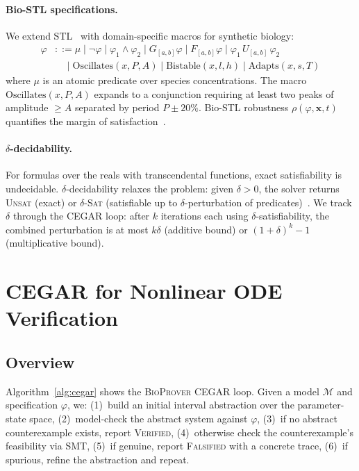 \documentclass[11pt]{article}
\newcommand{\bioprover}{\textsc{BioProver}}
\newcommand{\cegar}{\textsc{CEGAR}}
\newcommand{\stl}{\textsc{STL}}
\begin{document}
\paragraph{Bio-STL specifications.}
We extend \stl{}~\cite{maler2004monitoring} with domain-specific
macros for synthetic biology:
\begin{align*}
  \varphi &::= \mu \mid \neg\varphi \mid \varphi_1 \land \varphi_2
           \mid G_{[a,b]}\varphi \mid F_{[a,b]}\varphi
           \mid \varphi_1\,U_{[a,b]}\,\varphi_2 \\
  &\quad\mid \text{Oscillates}(x, P, A) \mid \text{Bistable}(x, l, h)
   \mid \text{Adapts}(x, s, T)
\end{align*}
where $\mu$ is an atomic predicate over species concentrations. The
macro $\text{Oscillates}(x,P,A)$ expands to a conjunction requiring
at least two peaks of amplitude $\geq A$ separated by period
$P \pm 20\%$. Bio-STL robustness $\rho(\varphi, \mathbf{x}, t)$
quantifies the margin of satisfaction~\cite{donze2013efficient}.

\paragraph{$\delta$-decidability.}
For formulas over the reals with transcendental functions,
exact satisfiability is undecidable. $\delta$-decidability
relaxes the problem: given $\delta > 0$, the solver returns
\textsc{Unsat} (exact) or $\delta$\textsc{-Sat} (satisfiable up to
$\delta$-perturbation of predicates)~\cite{gao2013dreal}. We track
$\delta$ through the \cegar{} loop: after $k$ iterations each using
$\delta$-satisfiability, the combined perturbation is at most
$k\delta$ (additive bound) or $(1+\delta)^k - 1$ (multiplicative
bound).

\section{CEGAR for Nonlinear ODE Verification}
\label{sec:cegar}

\subsection{Overview}

Algorithm~\ref{alg:cegar} shows the \bioprover{} \cegar{} loop.
Given a model $\mathcal{M}$ and specification $\varphi$, we:
(1)~build an initial interval abstraction over the parameter-state
space, (2)~model-check the abstract system against $\varphi$,
(3)~if no abstract counterexample exists, report \textsc{Verified},
(4)~otherwise check the counterexample's feasibility via SMT,
(5)~if genuine, report \textsc{Falsified} with a concrete trace,
(6)~if spurious, refine the abstraction and repeat.
\end{document}
